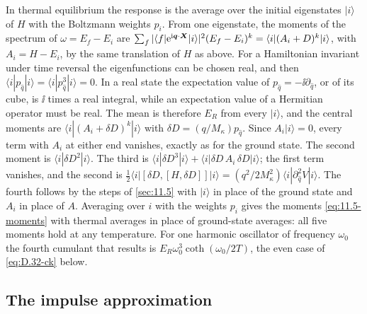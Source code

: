 In thermal equilibrium the response is the average over the initial eigenstates $|i\rangle$ of $H$ with the Boltzmann weights $p_i$. From one eigenstate, the moments of the spectrum of $\omega = E_f - E_i$ are $\sum_f|\langle f|\mathrm{e}^{\mathrm{i}\bm{q}\cdot\bm{X}}|i\rangle|^2(E_f - E_i)^k = \langle i|(A_i + D)^k|i\rangle$, with $A_i = H - E_i$, by the same translation of $H$ as above. For a Hamiltonian invariant under time reversal the eigenfunctions can be chosen real, and then $\langle i|p_{\hat q}|i\rangle = \langle i|p_{\hat q}^3|i\rangle = 0$. In a real state the expectation value of $p_{\hat q} = -\ii\partial_{\hat q}$, or of its cube, is $\ii$ times a real integral, while an expectation value of a Hermitian operator must be real. The mean is therefore $E_R$ from every $|i\rangle$, and the central moments are $\langle i|(A_i + \delta D)^k|i\rangle$ with $\delta D = (q/M_\kappa)p_{\hat q}$. Since $A_i|i\rangle = 0$, every term with $A_i$ at either end vanishes, exactly as for the ground state. The second moment is $\langle i|\delta D^2|i\rangle$. The third is $\langle i|\delta D^3|i\rangle + \langle i|\delta D\,A_i\,\delta D|i\rangle$; the first term vanishes, and the second is $\frac12\langle i|[\delta D,[H,\delta D]]|i\rangle = (q^2/2M_\kappa^2)\langle i|\partial_{\hat q}^2V|i\rangle$. The fourth follows by the steps of \cref{sec:11.5} with $|i\rangle$ in place of the ground state and $A_i$ in place of $A$. Averaging over $i$ with the weights $p_i$ gives the moments \cref{eq:11.5-moments} with thermal averages in place of ground-state averages: all five moments hold at any temperature. For one harmonic oscillator of frequency $\omega_0$ the fourth cumulant that results is $E_R\omega_0^3\coth(\omega_0/2T)$, the even case of \cref{eq:D.32-ck} below.

\subsection{The impulse approximation}

